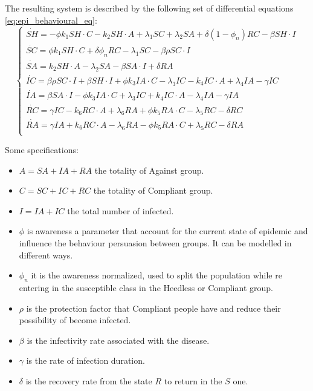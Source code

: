 The resulting system is described by the following set of differential equations \ref{eq:epi_behavioural_eq}: 
\begin{equation}
	\begin{cases}
		\dot{SH} = - \phi k_1 SH \cdot C - k_2 SH \cdot A + \lambda_1 SC + \lambda_2 SA + \delta(1-\phi_n)RC - \beta SH \cdot I\\
		\dot{SC} = \phi k_1 SH \cdot C + \delta \phi_n RC - \lambda_1 SC - \beta \rho SC \cdot I  \\
		\dot{SA} = k_2 SH \cdot A - \lambda_2 SA - \beta SA \cdot I + \delta RA \\
		\dot{IC} = \beta \rho SC \cdot I + \beta SH \cdot I + \phi k_3 IA \cdot C - \lambda_3 IC -  k_4 IC \cdot A + \lambda_4 IA - \gamma IC\\
		 \dot{IA} = \beta SA \cdot I - \phi k_3 IA \cdot C + \lambda_3 IC + k_4 IC \cdot A - \lambda_4 IA - \gamma IA\\
		 \dot{RC} = \gamma IC - k_6 RC \cdot A + \lambda_6 RA + \phi k_5 RA \cdot C - \lambda_5 RC - \delta RC\\
		 \dot{RA} = \gamma IA + k_6 RC \cdot A - \lambda_6 RA - \phi k_5 RA \cdot C + \lambda_5 RC - \delta RA\\
	\end{cases}
	\label{eq:epi_behavioural_eq}
\end{equation}

Some specifications:
\begin{itemize}
	\item $A = SA + IA + RA$ the totality of Against group.
	\item $C = SC + IC + RC$ the totality of Compliant group.
	\item $I = IA + IC$ the total number of infected.
	\item $\phi$ is awareness a parameter that account for the current state of epidemic and influence the behaviour persuasion between groups. It can be modelled in different ways. 
	\item $\phi_n$ it is the awareness normalized, used to split the population while re entering in the susceptible class in the Heedless or Compliant group. 
	\item $\rho$ is the protection factor that Compliant people have and reduce their possibility of become infected.
	\item $\beta$ is the infectivity rate associated with the disease.
	\item $\gamma$ is the rate of infection duration.
	\item $\delta$ is the recovery rate from the state $R$ to return in the $S$ one. 
\end{itemize}
